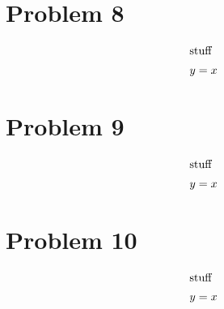 \documentclass[12pt]{article}
\begin{document}
\section*{Problem 8}

\begin{align} 
    \intertext{stuff}
    y&=x
\end{align}



\section*{Problem 9}

\begin{align} 
    \intertext{stuff}
    y&=x
\end{align}


\section*{Problem 10}

\begin{align} 
    \intertext{stuff}
    y&=x
\end{align}
\end{document}
